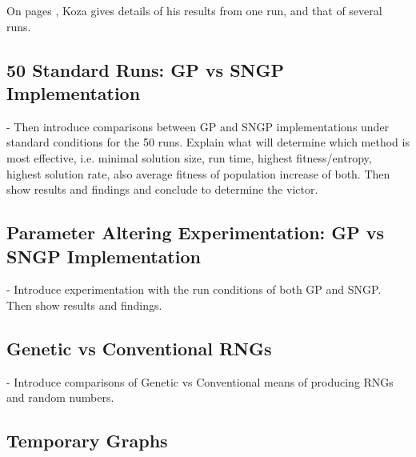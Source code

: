 \documentclass[a4paper,10.5pt]{article}
\begin{document}
On pages \cite[p. 6 - 7]{kozarng}, Koza gives details of his results from one run, and that of several runs.
\subsection{50 Standard Runs: GP vs SNGP Implementation}
- Then introduce comparisons between GP and SNGP implementations under standard conditions for the 50 runs. Explain what will determine which method is most effective, i.e. minimal solution size, run time, highest fitness/entropy, highest solution rate, also average fitness of population increase of both. Then show results and findings and conclude to determine the victor.\\

\subsection{Parameter Altering Experimentation: GP vs SNGP Implementation}
- Introduce experimentation with the run conditions of both GP and SNGP. Then show results and findings.\\

\subsection{Genetic vs Conventional RNGs}
- Introduce comparisons of Genetic vs Conventional means of producing RNGs and random numbers.\\



\subsection{Temporary Graphs}
\end{document}
